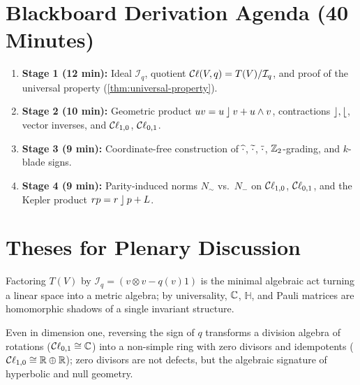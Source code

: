 \documentclass[11pt,a4paper]{article}
\begin{document}
\section{Blackboard Derivation Agenda (40 Minutes)}
\label{sec:agenda}

\begin{enumerate}
  \item \textbf{Stage 1 (12 min):} Ideal $\mathcal{I}_q$, quotient
    $\mathcal{C}\ell(V, q) = T(V)/\mathcal{I}_q$, and proof of the universal property
    (\cref{thm:universal-property}).
  \item \textbf{Stage 2 (10 min):} Geometric product $uv = u \mathbin{\rfloor} v +
    u \wedge v$, contractions $\mathbin{\rfloor},\mathbin{\lfloor}$, vector inverses, and $\mathcal{C}\ell_{1,0}$,
    $\mathcal{C}\ell_{0,1}$.
  \item \textbf{Stage 3 (9 min):} Coordinate-free construction of
    $\widehat{\cdot}$, $\widetilde{\cdot}$, $\overline{\cdot}$, $\mathbb{Z}_2$-grading, and
    $k$-blade signs.
  \item \textbf{Stage 4 (9 min):} Parity-induced norms $N_\sim$ vs.\ $N_-$ on
    $\mathcal{C}\ell_{1,0}$, $\mathcal{C}\ell_{0,1}$, and the Kepler product $rp = r \mathbin{\rfloor} p + L$.
\end{enumerate}

\section{Theses for Plenary Discussion}
\label{sec:theses}

\begin{thesis}
  Factoring $T(V)$ by $\mathcal{I}_q = ( v \otimes v - q(v)1 )$ is
  the minimal algebraic act turning a linear space into a metric algebra; by
  universality, $\mathbb{C}$, $\mathbb{H}$, and Pauli matrices are homomorphic shadows
  of a single invariant structure.
\end{thesis}

\begin{thesis}
  Even in dimension one, reversing the sign of $q$ transforms a division
  algebra of rotations ($\mathcal{C}\ell_{0,1} \cong \mathbb{C}$) into a non-simple ring with
  zero divisors and idempotents ($\mathcal{C}\ell_{1,0} \cong \mathbb{R} \oplus \mathbb{R}$); zero divisors
  are not defects, but the algebraic signature of hyperbolic and null geometry.
\end{thesis}
\end{document}
